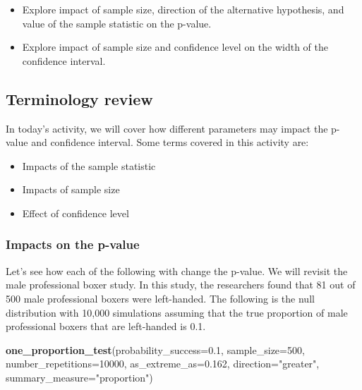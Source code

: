 \documentclass[
]{report}
\newenvironment{Shaded}{\begin{snugshade}}{\end{snugshade}}
\newcommand{\AttributeTok}[1]{\textcolor[rgb]{0.13,0.29,0.53}{#1}}
\newcommand{\DecValTok}[1]{\textcolor[rgb]{0.00,0.00,0.81}{#1}}
\newcommand{\FloatTok}[1]{\textcolor[rgb]{0.00,0.00,0.81}{#1}}
\newcommand{\FunctionTok}[1]{\textcolor[rgb]{0.13,0.29,0.53}{\textbf{#1}}}
\newcommand{\NormalTok}[1]{#1}
\newcommand{\StringTok}[1]{\textcolor[rgb]{0.31,0.60,0.02}{#1}}
\begin{document}
\begin{itemize}
\item
  Explore impact of sample size, direction of the alternative hypothesis, and value of the sample statistic on the p-value.
\item
  Explore impact of sample size and confidence level on the width of the confidence interval.
\end{itemize}

\subsection{Terminology review}\label{terminology-review-7}

In today's activity, we will cover how different parameters may impact the p-value and confidence interval. Some terms covered in this activity are:

\begin{itemize}
\item
  Impacts of the sample statistic
\item
  Impacts of sample size
\item
  Effect of confidence level
\end{itemize}

\subsubsection*{Impacts on the p-value}\label{impacts-on-the-p-value}

Let's see how each of the following with change the p-value. We will revisit the male professional boxer study. In this study, the researchers found that 81 out of 500 male professional boxers were left-handed. The following is the null distribution with 10,000 simulations assuming that the true proportion of male professional boxers that are left-handed is 0.1.

\begin{Shaded}
\begin{Highlighting}[]
\FunctionTok{one\_proportion\_test}\NormalTok{(}\AttributeTok{probability\_success=}\FloatTok{0.1}\NormalTok{,}
                    \AttributeTok{sample\_size=}\DecValTok{500}\NormalTok{,}
                    \AttributeTok{number\_repetitions=}\DecValTok{10000}\NormalTok{,}
                    \AttributeTok{as\_extreme\_as=}\FloatTok{0.162}\NormalTok{,}
                    \AttributeTok{direction=}\StringTok{"greater"}\NormalTok{,}
                    \AttributeTok{summary\_measure=}\StringTok{"proportion"}\NormalTok{)}
\end{Highlighting}
\end{Shaded}
\end{document}
